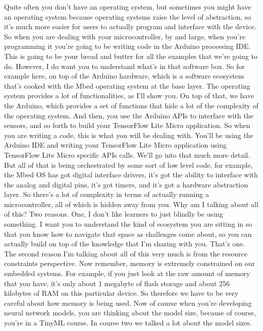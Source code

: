 Quite often you don't have an operating system,
but sometimes you might have an operating system
because operating systems raise the level of abstraction,
so it's much more easier for users to actually program and interface
with the device.
So when you are dealing with your microcontroller,
by and large, when you're programming it you're
going to be writing code in the Arduino processing IDE.
This is going to be your bread and butter for all the examples
that we're going to do.
However, I do want you to understand what's in that software box.
So for example here, on top of the Arduino hardware,
which is a software ecosystem that's cooked with the Mbed operating
system at the base layer.
The operating system provides a lot of functionalities, as I'll show you.
On top of that, we have the Arduino, which
provides a set of functions that hide a lot of the complexity of the operating
system.
And then, you use the Arduino APIs to interface with the sensors,
and so forth to build your TensorFlow Lite Micro application.
So when you are writing a code, this is what you will be dealing with.
You'll be using the Arduino IDE and writing your TensorFlow Lite Micro
application using TensorFlow Lite Micro specific APIs calls.
We'll go into that much more detail.
But all of that is being orchestrated by some sort of low level code,
for example, the Mbed OS has got digital interface drivers,
it's got the ability to interface with the analog and digital pins,
it's got timers, and it's got a hardware abstraction layer.
So there's a lot of complexity in terms of actually running a microcontroller,
all of which is hidden away from you.
Why am I talking about all of this?
Two reasons.
One, I don't like learners to just blindly be using something.
I want you to understand the kind of ecosystem
you are sitting in so that you know how to navigate that space as challenges
come about, so you can actually build on top of the knowledge
that I'm sharing with you.
That's one.
The second reason I'm talking about all of this
very much is from the resource constraints perspective.
Now remember, memory is extremely constrained on our embedded systems.
For example, if you just look at the raw amount of memory that you have,
it's only about 1 megabyte of flash storage
and about 256 kilobytes of RAM on this particular device.
So therefore we have to be very careful about how memory is being used.
Now of course when you're developing neural network models,
you are thinking about the model size, because of course,
you're in a TinyML course.
In course two we talked a lot about the model sizes.
